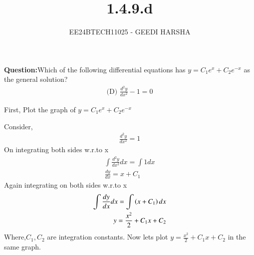 \documentclass[journal]{IEEEtran}
\begin{document}

\vspace{3cm}
\title{1.4.9.d}
\author{EE24BTECH11025 - GEEDI HARSHA}
{\let\newpage\relax\maketitle}

\renewcommand{\thefigure}{\theenumi}
\renewcommand{\thetable}{\theenumi}
\setlength{\intextsep}{10pt} %


\renewcommand{\thetable}{\theenumi}

\textbf{Question:}Which of the following differential equations has $y = C_1 e^x + C_2 e^{-x}$ as the general solution?\\

\begin{align}
\text{(D) } \frac{d^2y}{dx^2} - 1 = 0
\end{align}



\solution

First, Plot the graph of $y = C_1 e^x + C_2 e^{-x}$

Consider,
\begin{align}
\frac{d^2y}{dx^2} = 1 \label{2}
\end{align}
On integrating both sides w.r.to x
\begin{align}
\int \frac{d^2y}{dx^2} dx = \int 1 dx \\
\frac{dy}{dx} = x + C_1
\end{align}
Again integrating on both sides w.r.to x
\begin{align}
\int \frac{dy}{dx} dx = \int \left(x + C_1\right) dx \\
y = \frac{x^2}{2}+C_1x+C_2
\end{align}
Where,$C_1,C_2$ are integration constants.
Now lets plot $y = \frac{x^2}{2}+C_1x+C_2 $ in the same graph.\\ 
\end{document}
